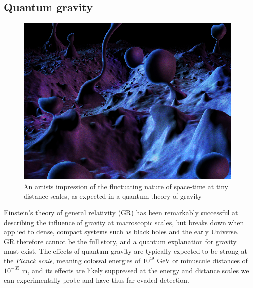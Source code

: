 \documentclass[a4paper,11pt]{article}
\begin{document}
\subsection{Quantum gravity}


\begin{figure} %
    \centering
		\includegraphics[width=1.\linewidth]{images/quantum_foam_2.png}
		\caption{An artists impression of the fluctuating nature of space-time at tiny distance scales, as expected in a quantum theory of gravity.}
		\vspace{-7pt}
		\label{fig:spacetime_foam}
\end{figure}

Einstein's theory of general relativity (GR) has been remarkably successful at describing the influence of gravity at macroscopic scales, but breaks down when applied to dense, compact systems such as black holes and the early Universe. GR therefore cannot be the full story, and a quantum explanation for gravity must exist. The effects of quantum gravity are typically expected to be strong at the \textit{Planck scale}, meaning colossal energies of $10^{19}$ GeV or minuscule distances of $10^{-35}$ m, and its effects are likely suppressed at the energy and distance scales we can experimentally probe and have thus far evaded detection.
\end{document}
